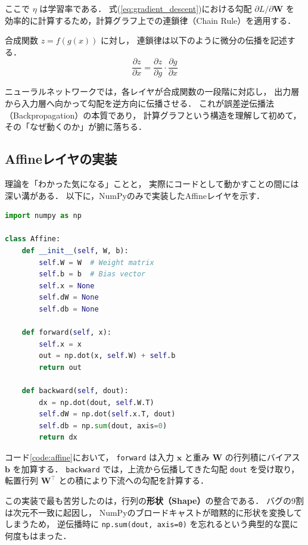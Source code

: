 \documentclass[uplatex, dvipdfmx, a4paper, 11pt]{jsarticle}
\begin{document}
ここで $\eta$ は学習率である．
式(\ref{eq:gradient_descent})における勾配 $\partial L / \partial \bm{W}$ を
効率的に計算するため，計算グラフ上での連鎖律（Chain Rule）を適用する．

合成関数 $z = f(g(x))$ に対し，
連鎖律は以下のように微分の伝播を記述する．
\begin{equation}
    \frac{\partial z}{\partial x} = \frac{\partial z}{\partial g} \cdot \frac{\partial g}{\partial x}
    \label{eq:chain_rule}
\end{equation}

ニューラルネットワークでは，各レイヤが合成関数の一段階に対応し，
出力層から入力層へ向かって勾配を逆方向に伝播させる．
これが誤差逆伝播法（Backpropagation）の本質であり，
計算グラフという構造を理解して初めて，
その「なぜ動くのか」が腑に落ちる．

\subsection{Affineレイヤの実装}
理論を「わかった気になる」ことと，
実際にコードとして動かすことの間には深い溝がある．
以下に，NumPyのみで実装したAffineレイヤを示す．

\vspace{5mm}

\begin{lstlisting}[language=Python, caption=Affine Layer Implementation, label=code:affine]
import numpy as np

class Affine:
    def __init__(self, W, b):
        self.W = W  # Weight matrix
        self.b = b  # Bias vector
        self.x = None
        self.dW = None
        self.db = None

    def forward(self, x):
        self.x = x
        out = np.dot(x, self.W) + self.b
        return out

    def backward(self, dout):
        dx = np.dot(dout, self.W.T)
        self.dW = np.dot(self.x.T, dout)
        self.db = np.sum(dout, axis=0)
        return dx
\end{lstlisting}

コード\ref{code:affine}において，
\texttt{forward} は入力 $\bm{x}$ と重み $\bm{W}$ の行列積にバイアス $\bm{b}$ を加算する．
\texttt{backward} では，上流から伝播してきた勾配 \texttt{dout} を受け取り，
転置行列 $\bm{W}^\top$ との積により下流への勾配を計算する．

この実装で最も苦労したのは，行列の\textbf{形状（Shape）}の整合である．
バグの9割は次元不一致に起因し，
NumPyのブロードキャストが暗黙的に形状を変換してしまうため，
逆伝播時に \texttt{np.sum(dout, axis=0)} を忘れるという典型的な罠に何度もはまった．
\end{document}
